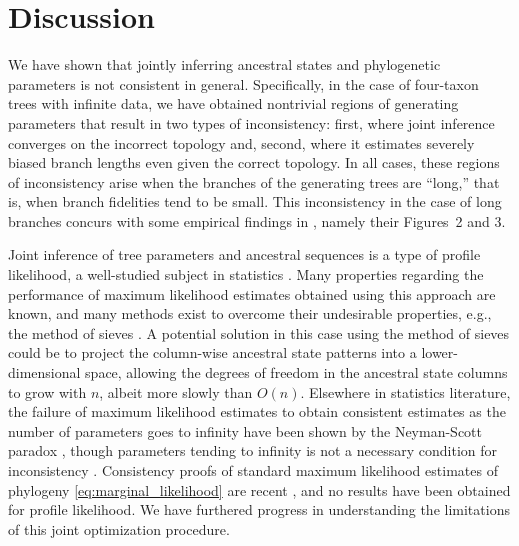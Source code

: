 \documentclass[11pt]{article}
\newcommand{\nCols}{n}
\begin{document}
\section*{Discussion}

We have shown that jointly inferring ancestral states and phylogenetic parameters \citep{Sagulenko2017-jo} is not consistent in general.
Specifically, in the case of four-taxon trees with infinite data, we have obtained nontrivial regions of generating parameters that result in two types of inconsistency: first, where joint inference converges on the incorrect topology and, second, where it estimates severely biased branch lengths even given the correct topology.
In all cases, these regions of inconsistency arise when the branches of the generating trees are ``long,'' that is, when branch fidelities tend to be small.
This inconsistency in the case of long branches concurs with some empirical findings in \citet{Sagulenko2017-jo}, namely their Figures~2 and 3.

Joint inference of tree parameters and ancestral sequences is a type of profile likelihood, a well-studied subject in statistics \citep{Murphy2000-ry}.
Many properties regarding the performance of maximum likelihood estimates obtained using this approach are known, and many methods exist to overcome their undesirable properties, e.g., the method of sieves \citep{Geman1982}.
A potential solution in this case using the method of sieves could be to project the column-wise ancestral state patterns into a lower-dimensional space, allowing the degrees of freedom in the ancestral state columns to grow with $\nCols$, albeit more slowly than $O(\nCols)$.
Elsewhere in statistics literature, the failure of maximum likelihood estimates to obtain consistent estimates as the number of parameters goes to infinity have been shown by the Neyman-Scott paradox \citep{Neyman1948-tt}, though parameters tending to infinity is not a necessary condition for inconsistency \citep{LeCam1990}.
Consistency proofs of standard maximum likelihood estimates of phylogeny \eqref{eq:marginal_likelihood} are recent \citep{RoyChoudhury2015-ta}, and no results have been obtained for profile likelihood.
We have furthered progress in understanding the limitations of this joint optimization procedure.
\end{document}
